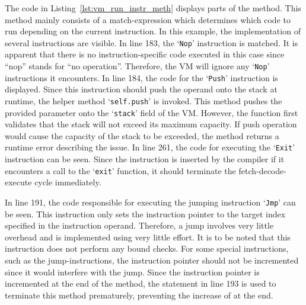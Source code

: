 
The code in Listing~\ref{lst:vm_run_instr_meth} displays parts of the  method.
This method mainly consists of a match-expression which determines which code to run depending on the current instruction.
In this example, the implementation of several instructions are visible.
In line 183, the `\texttt{Nop}' instruction is matched.
It is apparent that there is no instruction-specific code executed in this case since \enquote{nop} stands for \enquote{no operation}.
Therefore, the VM will ignore any `\texttt{Nop}' instructions it encounters.
In line 184, the code for the `\texttt{Push}' instruction is displayed.
Since this instruction should push the operand onto the stack at runtime, the helper method `\texttt{self.push}' is invoked.
This method pushes the provided parameter onto the `\texttt{stack}' field of the VM\@.
However, the function first validates that the stack will not exceed its maximum capacity.
If push operation would cause the capacity of the stack to be exceeded, the method returns a runtime error describing the issue.
In line 261, the code for executing the `\texttt{Exit}' instruction can be seen.
Since the instruction is inserted by the compiler if it encounters a call to the `\texttt{exit}' function,
it should terminate the fetch-decode-execute cycle immediately.

In line 191, the code responsible for executing the jumping instruction `\texttt{Jmp}' can be seen.
This instruction only sets the instruction pointer to the target index specified in the instruction operand.
Therefore, a jump involves very little overhead and is implemented using very little effort.
It is to be noted that this instruction does not perform any bound checks.
For some special instructions, such as the jump-instructions, the instruction pointer should not be incremented since it would interfere with the jump.
Since the instruction pointer is incremented at the end of the method, the  statement in line 193 is used to terminate this method prematurely, preventing the increase of  at the end.


